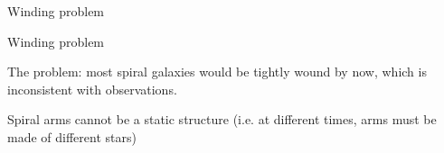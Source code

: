 \documentclass[letterpaper,landscape]{slides}
\begin{document}
\begin{slide}
\begin{center}
{\large \color{red} Winding problem }
\end{center}

\begin{center}




\end{center}

\vfill
\end{slide}


\begin{slide}
\begin{center}
{\large \color{red} Winding problem }
\end{center}

\begin{center}


{\color{blue} The problem: most spiral galaxies would be tightly
wound by now}, which is inconsistent with observations. 

{\color{blue} Spiral
arms cannot be a static structure} (i.e. at different times, arms
must be made of different stars)

\end{center}

\vfill
\end{slide}
\end{document}
